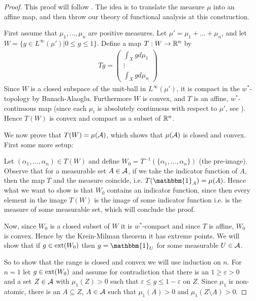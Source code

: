 \begin{proof}
This proof will follow \cite{Lindenstrauss66}. The idea is to translate the measure $\mu$ into an affine map, and then throw our theory of functional analysis at this construction.

First assume that $\mu_{1}, \dots, \mu_{n}$ are positive measures.
Let $\mu'=\mu_{1}+\dots+\mu_{n}$, and let $W=\{g \in L^{\infty}(\mu') | 0 \le g \le 1 \}$. Define a map $T:W \to \mathbb{R}^{n}$ by
\begin{align*}
	Tg=\begin{pmatrix}
		\int_{X} g d\mu_{1} \\
		\vdots \\
		\int_{X} g d\mu_{n}
	\end{pmatrix}
\end{align*}
Since $W$ is a closed subspace of the unit-ball in $L^{\infty}(\mu')$, it is compact in the $w^{*}$-topology by Banach-Alaoglu. Furthermore $W$ is convex, and $T$ is an affine, $w^{*}$-continuous map (since each $\mu_{i}$ is absolutely continuous with respect to $\mu'$, see ). Hence $T(W)$ is convex and compact as a subset of $\mathbb{R}^{n}$.


We now prove that $T(W)=\mu(\mathcal{A})$, which shows that $\mu(\mathcal{A})$ is closed and convex. First some more setup:

Let $(\alpha_{1}, \dots, \alpha_{n})\in T(W)$ and define $W_{0}=T^{-1}(\{\alpha_{1}, \dots, \alpha_{n}\})$ (the pre-image). 
Observe that for a measurable set $A\in \mathcal{A}$, if we take the indicator function of $A$, then the map $T$ and the measure coincide, i.e. $T(\mathbbm{1}_{A})=\mu(A)$. Hence what we want to show is that $W_{0}$ contains an indicator function, since then every element in the image $T(W)$ is the image of some indicator function i.e. is the measure of some measurable set, which will conclude the proof. 

Now, since $W_{0}$ is a closed subset of $W$ it is $w^{*}$-compact and since $T$ is affine, $W_{0}$ is convex. Hence by the Krein-Milman theorem it has extreme points. We will show that if $g\in \operatorname{ext}(W_{0})$ then $g=\mathbbm{1}_{U}$ for some measurable $U\in \mathcal{A}$.

So to show that the range is closed and convex we will use induction on $n$. For $n=1$ let $g\in \operatorname{ext}(W_{0})$ and assume for contradiction that there is an $1 \ge \varepsilon > 0$ and a set $Z\in \mathcal{A}$ with $\mu_{1}(Z)>0$ such that $\varepsilon \le g \le 1-\varepsilon$ on $Z$. Since $\mu_{1}$ is non-atomic, there is an $A\subseteq Z$, $A\in \mathcal{A}$ such that $\mu_{1}(A)>0$ and $\mu_{1}(Z\setminus A)>0$. 


\end{proof}
